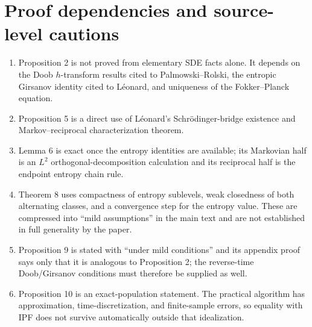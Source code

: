 \section{Proof dependencies and source-level cautions}
\begin{enumerate}[leftmargin=2em]
\item Proposition 2 is not proved from elementary SDE facts alone.  It depends on the Doob \(h\)-transform results cited to Palmowski--Rolski, the entropic Girsanov identity cited to L\'eonard, and uniqueness of the Fokker--Planck equation.
\item Proposition 5 is a direct use of L\'eonard's Schr\"odinger-bridge existence and Markov--reciprocal characterization theorem.
\item Lemma 6 is exact once the entropy identities are available; its Markovian half is an \(L^2\) orthogonal-decomposition calculation and its reciprocal half is the endpoint entropy chain rule.
\item Theorem 8 uses compactness of entropy sublevels, weak closedness of both alternating classes, and a convergence step for the entropy value.  These are compressed into ``mild assumptions'' in the main text and are not established in full generality by the paper.
\item Proposition 9 is stated with ``under mild conditions'' and its appendix proof says only that it is analogous to Proposition 2; the reverse-time Doob/Girsanov conditions must therefore be supplied as well.
\item Proposition 10 is an exact-population statement.  The practical algorithm has approximation, time-discretization, and finite-sample errors, so equality with IPF does not survive automatically outside that idealization.
\end{enumerate}



